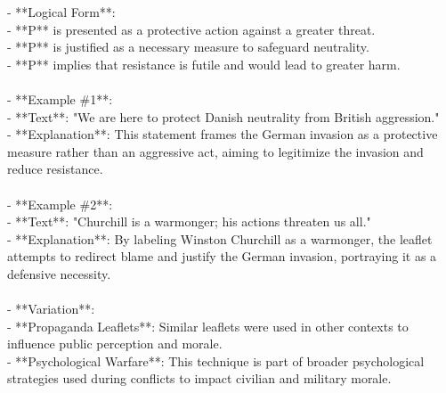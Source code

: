 \documentclass[a4paper,12pt,single,pdftex]{scrartcl}
\begin{document}
    
      - **Logical Form**:
    \\

    
        - **P** is presented as a protective action against a greater threat.
    \\

    
        - **P** is justified as a necessary measure to safeguard neutrality.
    \\

    
        - **P** implies that resistance is futile and would lead to greater harm.
    \\

    
      
    \\

    
      - **Example \#1**:
    \\

    
        - **Text**: "We are here to protect Danish neutrality from British aggression."
    \\

    
        - **Explanation**: This statement frames the German invasion as a protective measure rather than an aggressive act, aiming to legitimize the invasion and reduce resistance.
    \\

    
      
    \\

    
      - **Example \#2**:
    \\

    
        - **Text**: "Churchill is a warmonger; his actions threaten us all."
    \\

    
        - **Explanation**: By labeling Winston Churchill as a warmonger, the leaflet attempts to redirect blame and justify the German invasion, portraying it as a defensive necessity.
    \\

    
      
    \\

    
      - **Variation**:
    \\

    
        - **Propaganda Leaflets**: Similar leaflets were used in other contexts to influence public perception and morale.
    \\

    
        - **Psychological Warfare**: This technique is part of broader psychological strategies used during conflicts to impact civilian and military morale.
    \\
\end{document}
